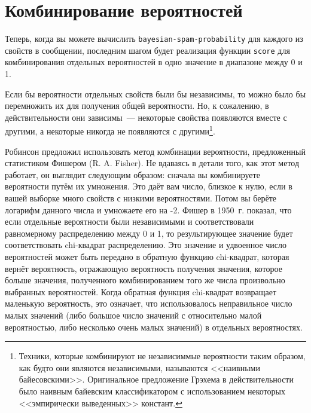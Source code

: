 \section{Комбинирование вероятностей}

Теперь, когда вы можете вычислить \lstinline{bayesian-spam-probability} для каждого из свойств
в сообщении, последним шагом будет реализация функции \lstinline{score} для комбинирования
отдельных вероятностей в одно значение в диапазоне между 0 и 1.

Если бы вероятности отдельных свойств были бы независимы, то можно было бы перемножить их
для получения общей вероятности.  Но, к сожалению, в действительности они зависимы~---
некоторые свойства появляются вместе с другими, а некоторые никогда не появляются с
другими\footnote{Техники, которые комбинируют не независиммые вероятности таким образом,
  как будто они являются независимыми, называются <<наивными байесовскими>>.  Оригинальное
  предложение Грэхема в действительности было наивным байевским классификатором с
  использованием некоторых <<эмпирически выведенных>> констант.}.

Робинсон предложил использовать метод комбинации вероятности, предложенный статистиком
Фишером (R. A. Fisher).  Не вдаваясь в детали того, как этот метод работает, он выглядит
следующим образом: сначала вы комбинируете вероятности путём их умножения.  Это даёт вам
число, близкое к нулю, если в вашей выборке много свойств с низкими вероятностями.  Потом
вы берёте логарифм данного числа и умножаете его на -2.  Фишер в 1950~г. показал, что если
отдельные вероятности были независимыми и соответствовали равномерному распределению
между 0 и 1, то результирующее значение будет соответствовать chi-квадрат
распределению. Это значение и удвоенное число вероятностей может быть передано в обратную
функцию chi-квадрат, которая вернёт вероятность, отражающую вероятность получения
значения, которое больше значения, полученного комбинированием того же числа произвольно
выбранных вероятностей.  Когда обратная функция chi-квадрат возвращает маленькую
вероятность, это означает, что использовалось неправильное число малых значений (либо
большое число значений с относительно малой вероятностью, либо несколько очень малых
значений) в отдельных вероятностях.

